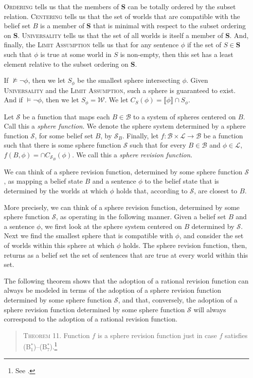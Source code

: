 \textsc{Ordering} tells us that the members of \textbf{S} can be totally ordered by the subset relation.
\textsc{Centering} tells us that the set of worlds that are compatible with the belief set $B$ is a member of \textbf{S} that is minimal with respect to the subset ordering on \textbf{S}.
\textsc{Universality} tells us that the set of all worlds is itself a member of \textbf{S}.
And, finally, the \textsc{Limit Assumption} tells us that for any sentence $\phi$ if the set of $S \in \textbf{S}$ such that $\phi$ is true at some world in $S$ is non-empty, then this set has a least element relative to the  subset ordering on \textbf{S}.

If $\not \models \lnot \phi$, then we let $S_\phi$ be the smallest sphere intersecting $\phi$.
Given \textsc{Universality} and the \textsc{Limit Assumption}, such a sphere is guaranteed to exist.
And if $\models \lnot \phi$, then we let $S_\phi = \mathcal{W}$.
We let $C_S(\phi) = \llbracket \phi \rrbracket \cap S_\phi$.

Let $\mathcal{S}$ be a function that maps each $B \in \mathcal{B}$ to a system of spheres centered on $B$.
Call this a \textit{sphere function}.
We denote the sphere system determined by a sphere function $\mathcal{S}$, for some belief set $B$, by $\mathcal{S}_B$.
Finally, let $f: \mathcal{B} \times \mathcal{L} \rightarrow \mathcal{B}$ be a function such that there is some sphere function $\mathcal{S}$ such that for every $B \in \mathcal{B}$ and $\phi \in \mathcal{L}$, $f(B, \phi) = \cap C_{\mathcal{S}_B}(\phi)$.
We call this a \textit{sphere revision function}.

We can think of a sphere revision function, determined by some sphere function $\mathcal{S}$, as mapping a belief state $B$ and a sentence $\phi$ to the belief state that is determined by the worlds at which $\phi$ holds that, according to $\mathcal{S}$, are closest to $B$.

More precisely, we can think of a sphere revision function, determined by some sphere function $\mathcal{S}$, as operating in the following manner.
Given a belief set $B$ and a sentence $\phi$, we first look at the sphere system centered on $B$ determined by $\mathcal{S}$.
Next we find the smallest sphere that is compatible with $\phi$, and consider the set of worlds within this sphere at which $\phi$ holds.
The sphere revision function, then, returns as a belief set the set of sentences that are true at every world within this set.

The following theorem shows that the adoption of a rational revision function can always be modeled in terms of the adoption of a sphere revision function determined by some sphere function $\mathcal{S}$, and that, conversely, the adoption of a sphere revision function determined by some sphere function $\mathcal{S}$ will always correspond to the adoption of a rational revision function.
\begin{quote}
\textsc{Theorem 11.}\; Function $f$ is a sphere revision function just in case $f$ satisfies (B$^*_1$)--(B$^*_7$).\footnote{See \citet{Grove1}.}
\end{quote}

